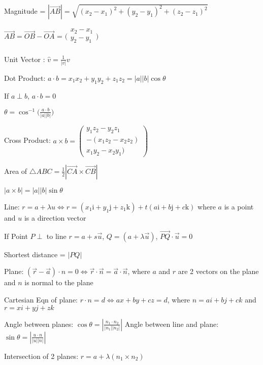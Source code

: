 \documentclass[a4paper,twoside,notitlepage,10pt]{article}
\begin{document}
\begin{landscape}
\begin{multicols}{2}
Magnitude = $|\overrightarrow{AB}| = \sqrt{(x_2-x_1)^2+(y_2-y_1)^2+(z_2-z_1)^2}$

$\overrightarrow{AB} =\overrightarrow{OB} - \overrightarrow{OA}$ = $\big(\begin{smallmatrix}
  x_2  -  x_1 \\
  y_2  -  y_1 \\
\end{smallmatrix}\big)$

Unit Vector : $\hat{v} = \frac{1}{|v|}v$

Dot Product: $a \cdot b = x_1x_2+y_1y_2+z_1z_2 = |a||b|\cos\theta $

If  $a\perp b$, $a \cdot b = 0$

$\theta = \cos^{-1}\big(\frac{a \cdot b}{|a||b|}\big)$

Cross Product: $a \times b  = \begin{pmatrix} 
  y_1z_2 - y_2z_1 \\
  -(x_1z_2 - x_2z_2)\\
  x_1y_2 - x_2y_1)
\end{pmatrix}$

Area of $\triangle ABC = \frac{1}{2}|\overrightarrow{CA} \times \overrightarrow{CB}|$

$|a \times b| = |a||b|\sin\theta$

Line: $r = a + \lambda u \Leftrightarrow r = (x_1\text{i} + y_1\text{j} + z_1\text{k}) + t(a\text{i} + b\text{j} + c\text{k})$ where $a$ is a point and $u$ is a direction vector

If Point $P\perp$ to line $r = a + s \overrightarrow{u}$, $Q = (a + \lambda \overrightarrow{u})$, $\overrightarrow{PQ} \cdot \overrightarrow{u} = 0$

Shortest distance = $|PQ|$

Plane: $(\overrightarrow{r} - \overrightarrow{a}) \cdot n = 0 \Leftrightarrow \overrightarrow{r} \cdot \overrightarrow{n} = \overrightarrow{a} \cdot \overrightarrow{n}$, where $a$ and $r$ are 2 vectors on the plane and $n$ is normal to the plane

Cartesian Eqn of plane: $r \cdot n = d \Leftrightarrow ax + by + cz = d$, where $n = ai + bj + ck$ and $r = xi + yj + zk$

Angle between planes: $\cos\theta =|\frac{n_1 \cdot n_2}{|n_1||n_2|}|$
Angle between line and plane: $\sin\theta = |\frac{u \cdot n}{|u||n|}|$

Intersection of 2 planes: $r = a + \lambda(n_1 \times n_2)$

\end{multicols}

\end{landscape}
\end{document}
